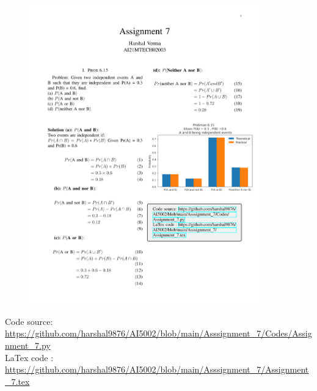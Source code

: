 \documentclass[journal,12pt,twocolumn]{IEEEtran}
\begin{document}
\begin{figure}[htp]
    \centering
    \includegraphics[width=10cm]{Assignment_7}
    \label{fig :plot}
\end{figure}

\begin{tcolorbox}
Code source: \url{https://github.com/harshal9876/AI5002/blob/main/Asssignment_7/Codes/Assignment_7.py} \\
LaTex code :
\url{https://github.com/harshal9876/AI5002/blob/main/Asssignment_7/Assignment_7.tex}
\end{tcolorbox}
\end{document}
